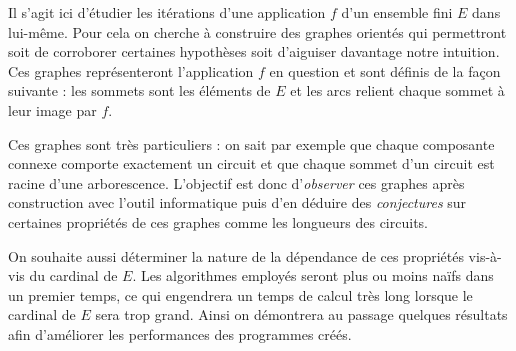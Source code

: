 \intro

Il s'agit ici d'\'etudier les it\'erations d'une application $f$ d'un ensemble fini $E$ dans lui-m\^eme. Pour cela on cherche \`a construire des graphes orient\'es qui permettront soit de corroborer certaines hypoth\`eses soit d'aiguiser davantage notre intuition. Ces graphes repr\'esenteront l'application $f$ en question et sont d\'efinis de la fa\c con suivante : les sommets sont les \'el\'ements de $E$ et les arcs relient chaque sommet \`a leur image par $f$.

Ces graphes sont tr\`es particuliers : on sait par exemple que chaque composante connexe comporte exactement un circuit et que chaque sommet d'un circuit est racine d'une arborescence. L'objectif est donc d'\emph{observer} ces graphes apr\`es construction avec l'outil informatique puis d'en d\'eduire des \emph{conjectures} sur certaines propri\'et\'es de ces graphes comme les longueurs des circuits.

On souhaite aussi d\'eterminer la nature de la d\'ependance de ces propri\'et\'es vis-\`a-vis du cardinal de $E$. Les algorithmes employ\'es seront plus ou moins \og na\"ifs \fg{} dans un premier temps, ce qui engendrera un temps de calcul tr\`es long lorsque le cardinal de $E$ sera trop grand. Ainsi on d\'emontrera au passage quelques r\'esultats afin d'am\'eliorer les performances des programmes cr\'e\'es.